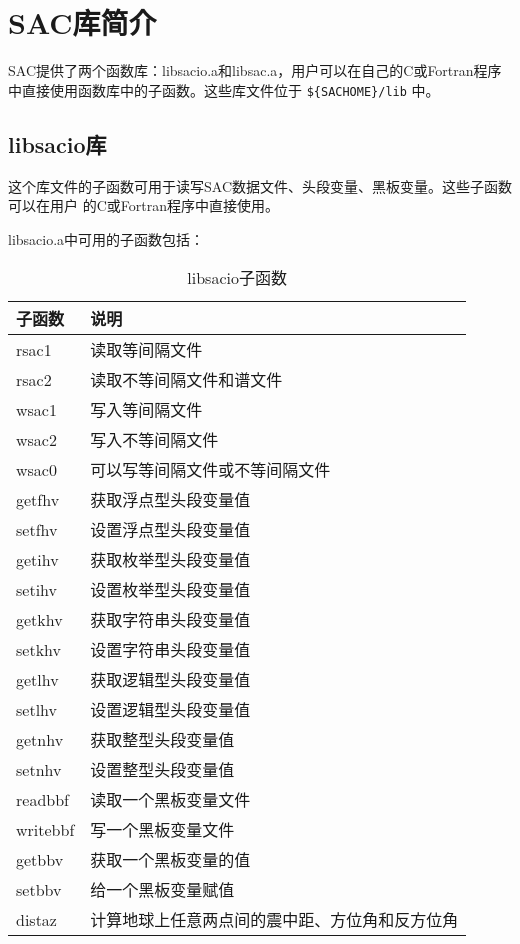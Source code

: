 \section{SAC库简介}
SAC提供了两个函数库：libsacio.a和libsac.a，用户可以在自己的C或Fortran程序
中直接使用函数库中的子函数。这些库文件位于 \verb|${SACHOME}/lib| 中。

\subsection{libsacio库}
这个库文件的子函数可用于读写SAC数据文件、头段变量、黑板变量。这些子函数可以在用户
的C或Fortran程序中直接使用。

libsacio.a中可用的子函数包括：
\begin{table}[H]
\centering
\caption{libsacio子函数}
\ttfamily
\begin{tabular}{ll}
\toprule
子函数      &       说明            \\
\midrule
rsac1       &       读取等间隔文件  \\
rsac2       &       读取不等间隔文件和谱文件    \\
wsac1       &       写入等间隔文件  \\
wsac2       &       写入不等间隔文件    \\
wsac0       &       可以写等间隔文件或不等间隔文件  \\
getfhv      &       获取浮点型头段变量值    \\
setfhv      &       设置浮点型头段变量值    \\
getihv      &       获取枚举型头段变量值    \\
setihv      &       设置枚举型头段变量值    \\
getkhv      &       获取字符串头段变量值    \\
setkhv      &       设置字符串头段变量值    \\
getlhv      &       获取逻辑型头段变量值    \\
setlhv      &       设置逻辑型头段变量值    \\
getnhv      &       获取整型头段变量值      \\
setnhv      &       设置整型头段变量值  \\
readbbf     &       读取一个黑板变量文件    \\
writebbf    &       写一个黑板变量文件      \\
getbbv      &       获取一个黑板变量的值    \\
setbbv      &       给一个黑板变量赋值      \\
distaz      &       计算地球上任意两点间的震中距、方位角和反方位角  \\
\bottomrule
\end{tabular}
\end{table}

